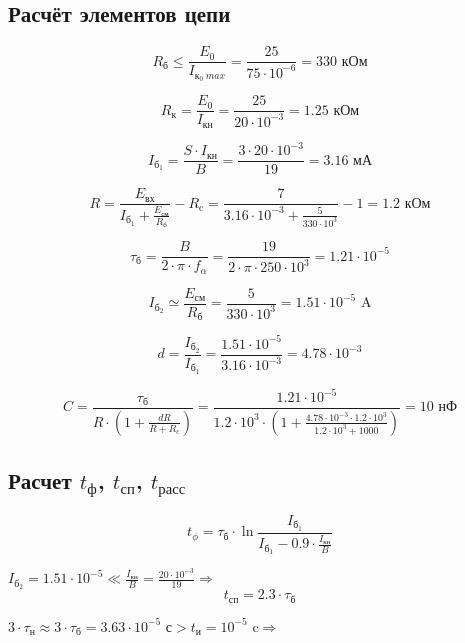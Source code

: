 \documentclass[a4paper,14pt]{extarticle}
\begin{document}
\subsection{Расчёт элементов цепи}

\[
R_\text{б} \leq \frac{E_0}{I_{\text{к}_0\ max}} = \frac{25}{75 \cdot 10^{-6}} = 330 \text{ кОм}
\]

\[
R_\text{к} = \frac{E_0}{I_\text{кн}} = \frac{25}{20 \cdot 10^{-3}} = 1.25 \text{ кОм}
\]

\[
I_{\text{б}_1} = \frac{S \cdot I_\text{кн}}{B} = \frac{3 \cdot 20 \cdot 10^{-3}}{19} = 3.16 \text{ мА}
\]

\[
R = \frac{E_\text{вх}}{I_{\text{б}_1} + \frac{E_\text{см}}{R_\text{б}}} - R_\text{c} = \frac{7}{3.16 \cdot 10^{-3} + \frac{5}{330 \cdot 10^3}} - 1 = 1.2 \text{ кОм}
\]

\[
\tau_{\text{б}} = \frac{B}{2 \cdot \pi \cdot f_\alpha} = \frac{19}{2 \cdot \pi \cdot 250 \cdot 10^3} = 1.21 \cdot 10^{-5}
\]

\[
I_{\text{б}_2} \simeq \frac{E_\text{см}}{R_\text{б}} = \frac{5}{330 \cdot 10^3} = 1.51 \cdot 10^{-5} \text{ A}
\]

\[
d = \frac{I_{\text{б}_2}}{I_{\text{б}_1}} = \frac{ 1.51 \cdot 10^{-5}}{3.16 \cdot 10^{-3}} = 4.78 \cdot 10^{-3}
\]

\[
C = \frac{\tau_{\text{б}}}{R \cdot \left( 1 + \frac{dR}{R+R_c} \right)} = \frac{1.21 \cdot 10^{-5}}{1.2 \cdot 10^3 \cdot \left( 1 + \frac{4.78 \cdot 10^{-3} \cdot 1.2 \cdot 10^3}{1.2 \cdot 10^3+1000} \right)} = 10 \text{ нФ}
\]

\subsection{Расчет $t_\text{ф}$, $t_\text{сп}$, $t_\text{расс}$}

\begin{equation}\label{eq:t_f}
t_\phi = \tau_{\text{б}} \cdot \ln{\frac{I_{\text{б}_1}}{I_{\text{б}_1} - 0.9 \cdot \frac{I_\text{кн}}{B}}}
\end{equation}

$I_{\text{б}_2} = 1.51 \cdot 10^{-5} \ll \frac{I_\text{кн}}{B} = \frac{20 \cdot 10^{-3}}{19} \Rightarrow$
\begin{equation}\label{eq:t_sp}
t_\text{сп} = 2.3 \cdot \tau_\text{б}
\end{equation}

$3 \cdot \tau_\text{н} \approx 3 \cdot \tau_{\text{б}} = 3.63 \cdot 10^{-5} \text{ с} > t_\text{и} = 10^{-5} \text{ c} \Rightarrow$
\end{document}
